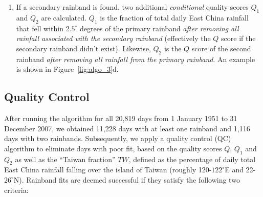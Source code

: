\documentclass[9pt,twocolumn,twoside,lineno]{pnas-new}
\begin{document}
\begin{enumerate}
	\item If a secondary rainband is found, two additional \textit{conditional} quality scores $Q_1$ and $Q_2$ are calculated. $Q_1$ is the fraction of total daily East China rainfall that fell within $2.5^{\circ}$ degrees of the primary rainband \textit{after removing all rainfall associated with the secondary rainband} (effectively the $Q$ score if the secondary rainband didn't exist). Likewise, $Q_2$ is the $Q$ score of the second rainband \textit{after removing all rainfall from the primary rainband}. An example is shown in Figure~\ref{fig:algo_3}d.		
	
\end{enumerate} 

\subsection*{Quality Control}

	After running the algorithm for all 20,819 days from 1 January 1951 to 31 December 2007, we obtained 11,228 days with at least one rainband and 1,116 days with two rainbands. Subsequently, we apply a quality control (QC) algorithm to eliminate days with poor fit, based on the quality scores $Q$, $Q_1$ and $Q_2$ as well as the ``Taiwan fraction'' $TW$, defined as the percentage of daily total East China rainfall falling over the island of Taiwan (roughly 120-$122^{\circ}$E and 22-$26^{\circ}$N). Rainband fits are deemed successful if they satisfy the following two criteria:
\end{document}
